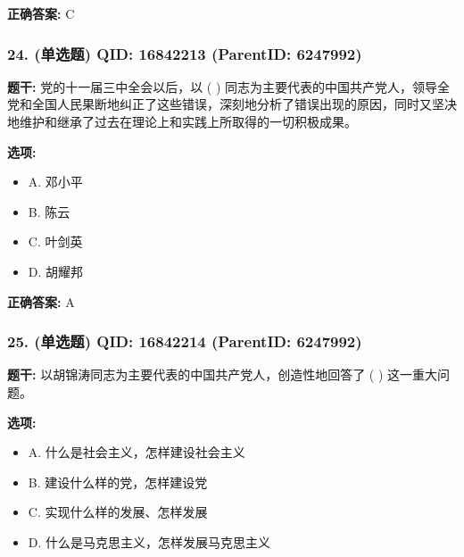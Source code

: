 \documentclass[12pt,UTF8]{ctexart}
\begin{document}
\textbf{正确答案:}
C

\vspace{0.3em}\hrulefill\vspace{0.7em}

\subsubsection*{24. (单选题) \small QID: 16842213 (ParentID: 6247992)}

\textbf{题干:}
党的十一届三中全会以后，以 ( ) 同志为主要代表的中国共产党人，领导全党和全国人民果断地纠正了这些错误，深刻地分析了错误出现的原因，同时又坚决地维护和继承了过去在理论上和实践上所取得的一切积极成果。



\textbf{选项:}
\begin{itemize}[leftmargin=*]

  \item A. 邓小平

  \item B. 陈云

  \item C. 叶剑英

  \item D. 胡耀邦

\end{itemize}

\textbf{正确答案:}
A

\vspace{0.3em}\hrulefill\vspace{0.7em}

\subsubsection*{25. (单选题) \small QID: 16842214 (ParentID: 6247992)}

\textbf{题干:}
以胡锦涛同志为主要代表的中国共产党人，创造性地回答了 ( ) 这一重大问题。



\textbf{选项:}
\begin{itemize}[leftmargin=*]

  \item A. 什么是社会主义，怎样建设社会主义

  \item B. 建设什么样的党，怎样建设党

  \item C. 实现什么样的发展、怎样发展

  \item D. 什么是马克思主义，怎样发展马克思主义

\end{itemize}
\end{document}
